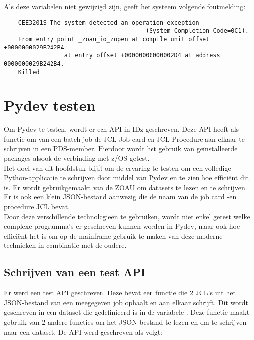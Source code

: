 Als deze variabelen niet gewijzigd zijn, geeft het systeem volgende foutmelding:
\begin{lstlisting}
    CEE3201S The system detected an operation exception 
                                        (System Completion Code=0C1).
    From entry point _zoau_io_zopen at compile unit offset +0000000029B242B4 
                 at entry offset +00000000000002D4 at address 0000000029B242B4.
    Killed
\end{lstlisting}

\chapter{Pydev testen}
\label{ch:test-pydev}

Om Pydev te testen, wordt er een API in IDz geschreven. Deze API heeft als functie om van een batch job de JCL Job card en JCL Procedure aan elkaar te schrijven in een PDS-member. Hierdoor wordt het gebruik van geïnstalleerde packages alsook de verbinding met z/OS getest. \\

Het doel van dit hoofdstuk blijft om de ervaring te testen om een volledige Python-applicatie te schrijven door middel van Pydev en te zien hoe efficiënt dit is. Er wordt gebruikgemaakt van de ZOAU om datasets te lezen en te schrijven. Er is ook een klein JSON-bestand aanwezig die de naam van de job card -en procedure JCL bevat. \\

Door deze verschillende technologieën te gebruiken, wordt niet enkel getest welke complexe programma's er geschreven kunnen worden in Pydev, maar ook hoe efficiënt het is om op de mainframe gebruik te maken van deze moderne technieken in combinatie met de oudere.

\section{Schrijven van een test API}
Er werd een test API geschreven. Deze bevat een functie die 2 JCL's uit het JSON-bestand van een meegegeven job ophaalt en aan elkaar schrijft. Dit wordt geschreven in een dataset die gedefinieerd is in de variabele . Deze functie maakt gebruik van 2 andere functies om het JSON-bestand te lezen en om te schrijven naar een dataset. De API werd geschreven als volgt: \\

